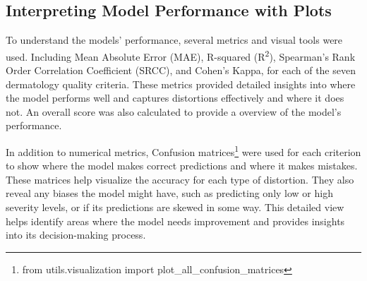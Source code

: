 \subsection{Interpreting Model Performance with Plots}
To understand the models’ performance, several metrics and visual tools were used. Including Mean Absolute Error (MAE), R-squared (R\textsuperscript{2}), Spearman’s Rank Order Correlation Coefficient (SRCC), and Cohen’s Kappa, for each of the seven dermatology quality criteria. These metrics provided detailed insights into where the model performs well and captures distortions effectively and where it does not. An overall score was also calculated to provide a overview of the model’s performance. \par
\vspace{\baselineskip}
\noindent
In addition to numerical metrics, Confusion matrices\footnote{from utils.visualization import plot\_all\_confusion\_matrices} were used for each criterion to show where the model makes correct predictions and where it makes mistakes. These matrices help visualize the accuracy for each type of distortion. They also reveal any biases the model might have, such as predicting only low or high severity levels, or if its predictions are skewed in some way. This detailed view helps identify areas where the model needs improvement and provides insights into its decision-making process. \par

\clearpage
